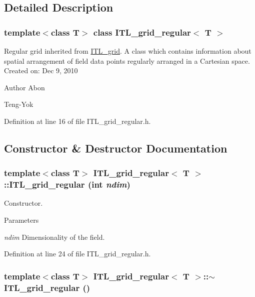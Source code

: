 \subsection{Detailed Description}
\subsubsection*{template$<$class T$>$ class ITL\_\-grid\_\-regular$<$ T $>$}

Regular grid inherited from \hyperlink{classITL__grid}{ITL\_\-grid}. A class which contains information about spatial arrangement of field data points regularly arranged in a Cartesian space. Created on: Dec 9, 2010 \begin{DoxyAuthor}{Author}
Abon 

Teng-\/Yok 
\end{DoxyAuthor}


Definition at line 16 of file ITL\_\-grid\_\-regular.h.



\subsection{Constructor \& Destructor Documentation}
\hypertarget{classITL__grid__regular_a6fc8f7b939590292ec89bf0e69dd3329}{
\subsubsection[{ITL\_\-grid\_\-regular}]{\setlength{\rightskip}{0pt plus 5cm}template$<$class T$>$ {\bf ITL\_\-grid\_\-regular}$<$ T $>$::{\bf ITL\_\-grid\_\-regular} (int {\em ndim})}}
\label{classITL__grid__regular_a6fc8f7b939590292ec89bf0e69dd3329}


Constructor. 


\begin{DoxyParams}{Parameters}
\item[{\em ndim}]Dimensionality of the field. \end{DoxyParams}


Definition at line 24 of file ITL\_\-grid\_\-regular.h.

\hypertarget{classITL__grid__regular_a360a8aba9edd80a56d2f0020c89d1287}{
\subsubsection[{$\sim$ITL\_\-grid\_\-regular}]{\setlength{\rightskip}{0pt plus 5cm}template$<$class T$>$ {\bf ITL\_\-grid\_\-regular}$<$ T $>$::$\sim${\bf ITL\_\-grid\_\-regular} ()}}
\label{classITL__grid__regular_a360a8aba9edd80a56d2f0020c89d1287}


